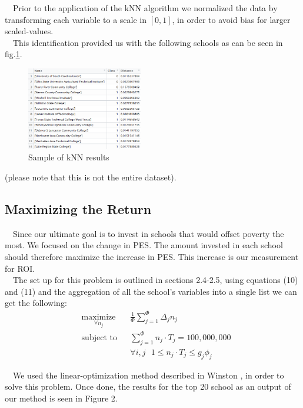 \documentclass[12pt]{scrartcl}
\begin{document}
		\ \ Prior to the application of the kNN algorithm we normalized the data by transforming each variable to a scale in $[0,1]$, in order to avoid bias for larger scaled-values.\\
		\clearpage
		\ \ This identification provided us with the following schools as can be seen in fig.\ref{fig:kNN}.
		\begin{figure}[H]
			\centering
			\includegraphics[width=0.45\textwidth]{nearest-schools.png}
			\caption{Sample of kNN results}
			\label{fig:kNN}
		\end{figure}
		(please note that this is not the entire dataset).
	
	\subsection{Maximizing the Return}
		\ \ Since our ultimate goal is to invest in schools that would offset poverty the most. We focused on the change in PES. The amount invested in each school should therefore maximize the increase in PES. This increase is our measurement for ROI.\\
		
		\ \ The set up for this problem is outlined in sections 2.4-2.5, using equations (10) and (11) and the aggregation of all the school's variables into a single list we can get the following:
		\begin{equation*}
				\begin{aligned}
					& \underset{\forall n_j}{\text{maximize}}
					& &\frac{ 1  }{ \Phi }\sum_{j=1}^\Phi \Delta_j n_j\\
					& \text{subject to}
					& & \sum_{j=1}^\Phi n_j\cdot T_j = 100,000,000\\
					&&& \forall i,j \ \ \ 1\le n_j\cdot T_j \le g_j\phi_j
				\end{aligned}	
		\end{equation*}

		\ \ We used the linear-optimization method described in Winston \cite{Winston}, in order to solve this problem. Once done, the results for the top 20 school as an output of our method is seen in Figure 2.\\
\end{document}
